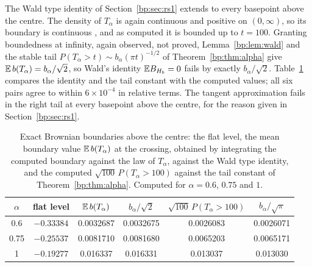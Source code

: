 The Wald type identity of Section~\ref{bp:sec:rs1} extends to every basepoint above the centre. The density of $T_\alpha$ is again continuous and positive on $(0,\infty)$, so its boundary is continuous \cite[Theorem 8.2]{EkstromJanson16}, and as computed it is bounded up to $t=100$. Granting boundedness at infinity, again observed, not proved, Lemma~\ref{bp:lem:wald} and the stable tail $P(T_\alpha>t)\sim b_\alpha(\pi t)^{-1/2}$ of Theorem~\ref{bp:thm:alpha} give $\mathbb{E}\,b(T_\alpha)=b_\alpha/\sqrt2$, so Wald's identity $\mathbb{E} B_{H_b}=0$ fails by exactly $b_\alpha/\sqrt2$. Table~\ref{bp:tab:across} compares the identity and the tail constant with the computed values; all six pairs agree to within $6\times10^{-4}$ in relative terms. The tangent approximation fails in the right tail at every basepoint above the centre, for the reason given in Section~\ref{bp:sec:rs1}.

\begin{table}[htbp]
\centering\small
\begin{tabular}{cccccc}
\toprule
$\alpha$ & flat level & $\mathbb{E}\,b(T_\alpha)$ & $b_\alpha/\sqrt2$ & $\sqrt{100}\,P(T_\alpha>100)$ & $b_\alpha/\sqrt\pi$\\
\midrule
0.6 & $-0.33384$ & 0.0032687 & 0.0032675 & 0.0026083 & 0.0026071\\
0.75 & $-0.25537$ & 0.0081710 & 0.0081680 & 0.0065203 & 0.0065171\\
1 & $-0.19277$ & 0.016337 & 0.016331 & 0.013037 & 0.013030\\
\bottomrule
\end{tabular}
\caption{Exact Brownian boundaries above the centre: the flat level, the mean boundary value $\mathbb{E}\,b(T_\alpha)$ at the crossing, obtained by integrating the computed boundary against the law of $T_\alpha$, against the Wald type identity, and the computed $\sqrt{100}\,P(T_\alpha>100)$ against the tail constant of Theorem~\ref{bp:thm:alpha}. Computed for $\alpha=0.6$, $0.75$ and $1$.}
\label{bp:tab:across}
\end{table}
